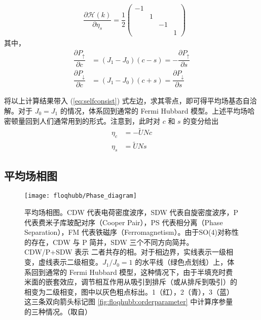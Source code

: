 \begin{align}
    & \dfrac{\partial\mathcal{H}(k)}{\partial \eta_s}=\dfrac{1}{2}
        \begin{pmatrix}
            -1 & & & \\
            & 1 & & \\
            & & -1 & \\
            & & & 1 
        \end{pmatrix} 
\end{align}
其中，
\begin{align}
    \dfrac{\partial P_{\uparrow}}{\partial c} 
        &= (J_1-J_0)(c-s) = -\dfrac{\partial P_{\uparrow}}{\partial s} \\
    \dfrac{\partial P_{\downarrow}}{\partial c} &= (J_1-J_0)(c+s) = \dfrac{\partial P_{\downarrow}}{\partial s} 
\end{align}


将以上计算结果带入 (\ref{eq:selfconsist}) 式左边，求其零点，即可得平均场基态自洽解。对于 $J_0=J_1$ 的情况，体系回到通常的 Fermi Hubbard 模型。上述平均场哈密顿量回到人们通常用到的形式。注意到，此时对 $c$ 和 $s$ 的变分给出
\begin{align}
\eta_c &= -\tilde{U}Nc \\
\eta_s &= \tilde{U}Ns
\end{align}



\subsection{平均场相图}

\begin{figure}[!htb]
\centering
\texttt{[image: floqhubb/Phase\_diagram]}
\caption{平均场相图。CDW 代表电荷密度波序，SDW 代表自旋密度波序，P 代表费米子库玻配对序（Cooper Pair），PS 代表相分离（Phase Separation），FM 代表铁磁序（Ferromagnetism）。由于SO(4)对称性的存在，CDW 与 P 简并，SDW 三个不同方向简并。CDW/P+SDW 表示 二者共存的相。对于相边界，实线表示一级相变，虚线表示二级相变。$J_1/J_0=1$ 的水平线（绿色点划线）上，体系回到通常的 Fermi Hubbard 模型，这种情况下，由于半填充时费米面的嵌套效应，调节相互作用从吸引到排斥（或从排斥到吸引）的相变为二级相变，图中以灰色粗点标出。1（红），2（青），3（蓝）这三条双向箭头标记图 \ref{fig:floqhubb:orderparameter} 中计算序参量的三种情况。（取自）}
\label{fig:floqhubb:phasediagram}
\end{figure}

